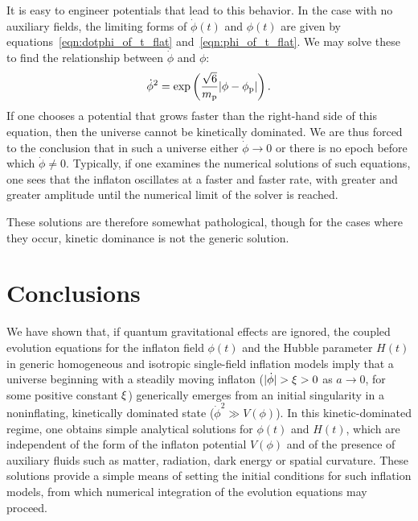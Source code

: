It is easy to engineer potentials that lead to this behavior. In the case with no auxiliary fields, the limiting forms of \(\dot{\phi}(t)\) and \(\phi(t)\) are given by equations~\eqref{eqn:dotphi_of_t_flat} and~\eqref{eqn:phi_of_t_flat}. We may solve these to find the relationship between \(\dot{\phi}\) and \(\phi\):
%
\begin{equation}
  \dot{\phi}^2 = \exp\left(\frac{\sqrt{6}}{m_{\mathrm{p}}} |\phi-\phi_{\mathrm{p}}|\right).
\end{equation}
%
If one chooses a potential that grows faster than the right-hand side of this equation, then the universe cannot be kinetically dominated.  We are thus forced to the conclusion that in such a universe either \(\dot{\phi}\to 0\) or there is no epoch before which \(\dot{\phi}\ne 0\).  Typically, if one examines the numerical solutions of such equations, one sees that the inflaton oscillates at a faster and faster rate, with greater and greater amplitude until the numerical limit of the solver is reached.

These solutions are therefore somewhat pathological, though for the cases where they occur, kinetic dominance is not the generic solution.









\section{Conclusions}
\label{sec:Conclusions}

We have shown that, if quantum gravitational effects are ignored, the coupled evolution equations for the inflaton field \(\phi(t)\) and the Hubble parameter \(H(t)\) in generic homogeneous and isotropic single-field inflation models imply that a universe beginning with a steadily moving inflaton (\(|\dot{\phi}| > \xi > 0\) as \(a\to 0\), for some positive constant \(\xi\)) generically emerges from an initial singularity in a noninflating, kinetically dominated state (\(\dot{\phi}^2 \gg V(\phi)\)).  In this kinetic-dominated regime, one obtains simple analytical solutions for \(\phi(t)\) and \(H(t)\), which are independent of the form of the inflaton potential \(V(\phi)\) and of the presence of auxiliary fluids such as matter, radiation, dark energy or spatial curvature. These solutions provide a simple means of setting the initial conditions for such inflation models, from which numerical integration of the evolution equations may proceed.

